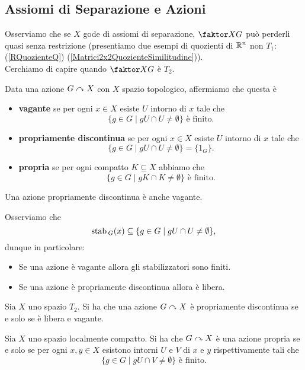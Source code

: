 \begin{multicols*}{2}
\subsection{Assiomi di Separazione e Azioni}
Osserviamo che se $X$ gode di assiomi di separazione, $\quot XG$ pu\`o perderli quasi senza restrizione (presentiamo due esempi di quozienti di $\mathbb{R}^n$ non $T_1$: (\ref{RQuozienteQ}) (\ref{Matrici2x2QuozienteSimilitudine})).\\
Cerchiamo di capire quando $\quot XG$ \`e $T_2$.
\begin{definition}
Data una azione $G\curvearrowright X$ con $X$ spazio topologico, affermiamo che questa \`e
\begin{itemize}[noitemsep]
\item \textbf{vagante} se per ogni $x\in X$ esiste $U$ intorno di $x$ tale che
\[\{g\in G\mid gU\cap U\neq \emptyset\}\text{ \`e finito.}\]
\item \textbf{propriamente discontinua} se per ogni $x\in X$ esiste $U$ intorno di $x$ tale che
\[\{g\in G\mid gU\cap U\neq \emptyset\}=\{1_G\}.\]
\item \textbf{propria} se per ogni compatto $K\subseteq X$ abbiamo che
\[\{g\in G\mid gK\cap K\neq \emptyset\}\text{ \`e finito.}\]
\end{itemize}
\end{definition}
\begin{remark}
Una azione propriamente discontinua \`e anche vagante.
\end{remark}
\begin{remark}
Osserviamo che
\[\mathrm{stab}\,_G(x)\subseteq \{g\in G\mid gU\cap U\neq \emptyset\},\]
dunque in particolare:
\begin{itemize}[noitemsep]
\item Se una azione \`e vagante allora gli stabilizzatori sono finiti.
\item Se una azione \`e propriamente discontinua allora \`e libera.
\end{itemize}
\end{remark}

\begin{theorem}\label{SuT2AzionePropriamenteDiscontinuaSeESoloSeLiberaEVagante}
Sia $X$ uno spazio $T_2$. Si ha che una azione $G\curvearrowright X$ \`e propriamente discontinua se e solo se \`e libera e vagante.
\end{theorem}

\begin{theorem}\label{CaratterizzazioneAzionePropiasuLocalmenteCompatto}
Sia $X$ uno spazio localmente compatto. Si ha che $G\curvearrowright X$ \`e una azione propria se e solo se per ogni $x,y\in X$ esistono intorni $U$ e $V$ di $x$ e $y$ rispettivamente tali che
\[\{g\in G\mid gU\cap V\neq \emptyset\}\text{ \`e finito.}\]
\end{theorem}


\end{multicols*}
